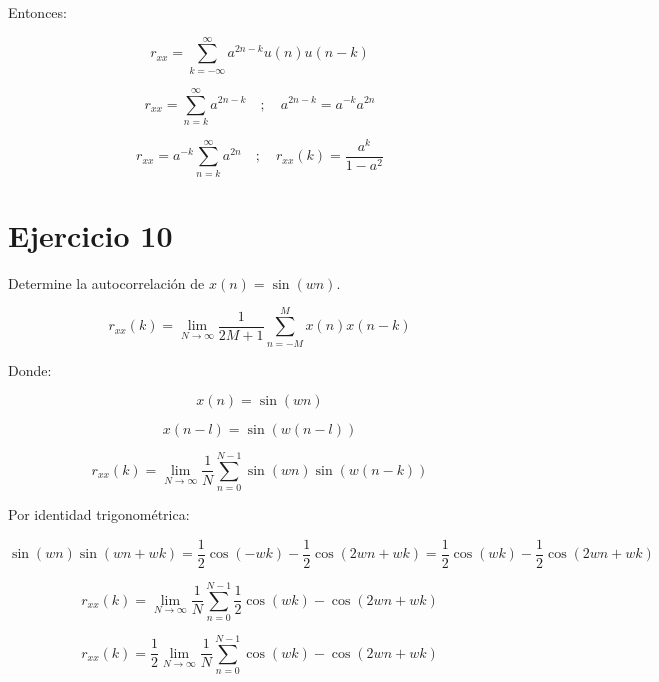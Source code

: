 \documentclass[12pt,a4paper]{article}
\begin{document}
Entonces:

\begin{equation}
r_{xx} = \sum_{k=-\infty}^{\infty} a^{2n-k} u(n) u(n-k)
\end{equation}

\begin{equation}
r_{xx} = \sum_{n=k}^{\infty} a^{2n-k} \quad ; \quad a^{2n-k} = a^{-k} a^{2n}
\end{equation}

\begin{equation}
r_{xx} = a^{-k} \sum_{n=k}^{\infty} a^{2n} \quad ; \quad r_{xx}(k) = \boxed{\frac{a^k}{1-a^2}}
\end{equation}

\section*{Ejercicio 10}

Determine la autocorrelación de $x(n) = \sin(wn)$.

\begin{equation}
r_{xx}(k) = \lim_{N \to \infty} \frac{1}{2M+1} \sum_{n=-M}^{M} x(n) x(n-k)
\end{equation}

Donde:

\begin{equation}
x(n) = \sin(wn)
\end{equation}

\begin{equation}
x(n-l) = \sin(w(n-l))
\end{equation}

\begin{equation}
r_{xx}(k) = \lim_{N \to \infty} \frac{1}{N} \sum_{n=0}^{N-1} \sin(wn) \sin(w(n-k))
\end{equation}

Por identidad trigonométrica:

\begin{equation}
\sin(wn) \sin(wn+wk) = \frac{1}{2} \cos(-wk) - \frac{1}{2} \cos(2wn+wk) = \frac{1}{2}\cos(wk) - \frac{1}{2}\cos(2wn+wk)
\end{equation}

\begin{equation}
r_{xx}(k) = \lim_{N \to \infty} \frac{1}{N} \sum_{n=0}^{N-1} \frac{1}{2}\cos(wk) - \cos(2wn+wk)
\end{equation}

\begin{equation}
r_{xx}(k) = \frac{1}{2}\lim_{N \to \infty} \frac{1}{N} \sum_{n=0}^{N-1}\cos(wk) - \cos(2wn+wk)
\end{equation}
\end{document}

